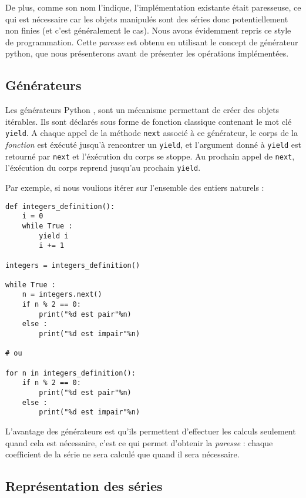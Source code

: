 \documentclass[12pt]{report}
\begin{document}
De plus, comme son nom l'indique, l'implémentation existante était paresseuse, ce qui est
nécessaire car les objets manipulés sont des séries donc potentiellement non
finies (et c'est généralement le cas). Nous avons évidemment repris ce style
de programmation. Cette \emph{paresse} est obtenu en utilisant le concept de
générateur python, que nous présenterons avant de présenter les opérations
implémentées.

\subsection{Générateurs}
Les générateurs Python \cite{genpython}, sont un mécanisme permettant de créer
des objets itérables. Ils sont déclarés sous forme de fonction classique
contenant le mot clé \verb|yield|. A chaque appel de la méthode \verb|next|
associé à ce générateur, le corps de la \emph{fonction} est éxécuté jusqu'à
rencontrer un \verb|yield|, et l'argument donné à \verb|yield| est retourné
par \verb|next| et l'éxécution du corps se stoppe. Au prochain appel de
\verb|next|, l'éxécution du corps reprend jusqu'au prochain \verb|yield|.


Par exemple, si nous voulions itérer sur l'ensemble des entiers naturels :

\noindent\begin{minipage}{\linewidth}
\begin{lstlisting}
def integers_definition():
    i = 0
    while True :
        yield i
        i += 1

integers = integers_definition()

while True :
    n = integers.next()
    if n % 2 == 0:
        print("%d est pair"%n)
    else :
        print("%d est impair"%n)

# ou

for n in integers_definition():
    if n % 2 == 0:
        print("%d est pair"%n)
    else :
        print("%d est impair"%n)
\end{lstlisting}
\end{minipage}

L'avantage des générateurs est qu'ils permettent d'effectuer les calculs seulement
quand cela est nécessaire, c'est ce qui permet d'obtenir la \emph{paresse} :
chaque coefficient de la série ne sera calculé que quand il sera nécessaire.

\subsection{Représentation des séries}
\end{document}
